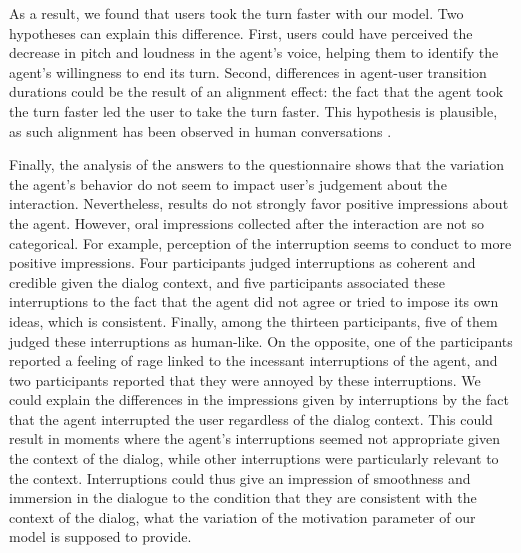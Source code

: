  As a result, we found that users took the turn faster with our model. Two hypotheses can explain this difference. 
First, users could have perceived the decrease in pitch and loudness in the agent's voice, helping them to identify the agent's willingness to end its turn. 
Second, differences in agent-user transition durations could be the result of an alignment effect: the fact that the agent took the turn faster led the user to take the turn faster. This hypothesis is plausible, as such alignment has been observed in human conversations \citep{levitan_entrainment_2015}.  

Finally, the analysis of the answers to the questionnaire shows that the variation the agent's behavior do not seem to impact user's judgement about the interaction. Nevertheless, results do not strongly favor positive impressions about the agent. However, oral impressions collected after the interaction are not so categorical.   
For example, perception of the interruption seems to conduct to more positive impressions. Four participants judged interruptions as coherent and credible given the dialog context, and five participants associated these interruptions to the fact that the agent did not agree or tried to impose its own ideas, which is consistent. 
Finally, among the thirteen participants, five of them judged these interruptions as human-like. On the opposite, one of the participants reported a feeling of rage linked to the incessant interruptions of the agent, and two participants reported that they were annoyed by these interruptions. We could explain the differences in the impressions given by interruptions by the fact that the agent interrupted the user regardless of the dialog context. This could result in moments where the agent's interruptions seemed not appropriate given the context of the dialog, while other interruptions were particularly relevant to the context. Interruptions could thus give an impression of smoothness and immersion in the dialogue to the condition that they are consistent with the context of the dialog, what the variation of the motivation parameter of our model is supposed to provide.
